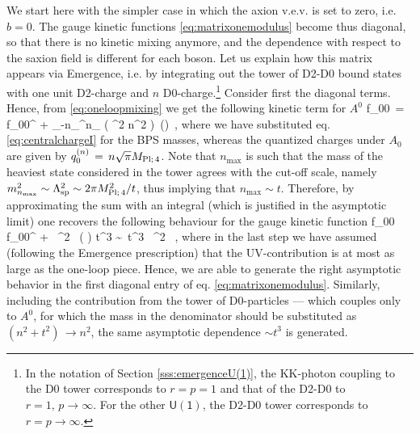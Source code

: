 We start here with the simpler case in which the axion v.e.v. is set to zero, i.e. $b=0$. The gauge kinetic functions \eqref{eq:matrixonemodulus} become thus diagonal, so that there is no kinetic mixing anymore, and the dependence with respect to the saxion field is different for each boson. Let us explain how this matrix appears via Emergence, i.e. by integrating out the tower of D2-D0 bound states with one unit D2-charge and $n$ D0-charge.\footnote{In the notation of Section \ref{sss:emergenceU(1)}, the KK-photon coupling to the D0 tower corresponds to $r=p=1$ and that of the D2-D0 to $r=1,\, p \to \infty$. For the other $\mathsf{U(1)}$, the D2-D0 tower corresponds to $r=p \to \infty$.} Consider first the diagonal terms. Hence, from \eqref{eq:oneloopmixing} we get the following kinetic term for $A^0$ 
%
\beq \label{eq:f00}
		f_{00}\, =\, f_{00}^{} +  \sum_{-n_{}}^{n_{}}  \left( \pi \Mpf^2 n^2 \right)\ \log \left(\right)\, ,
\eeq
%
where we have substituted eq. \eqref{eq:centralchargeI} for the BPS masses, whereas the quantized charges under $A_0$ are given by $q_0^{(n)}\, =\, n  \sqrt{\pi} M_{\text{Pl;}\, 4}$. Note that $n_{\text{max}}$ is such that the mass of the heaviest state considered in the tower agrees with the cut-off scale, namely $m_{n_{\text{max}}}^2 \sim \Lambda_{\text{sp}}^2 \sim 2 \pi M_{\text{Pl;}\, 4}^2/ t$, thus implying that $n_{\text{max}} \sim t$. Therefore, by approximating the sum with an integral (which is justified in the asymptotic limit) one recovers the following behaviour for the gauge kinetic function
%
\beq 
		f_{00}\, \simeq\, f_{00}^{} +  \beta \,  \Mpf^2 \, \left( \right)
		t^3 \sim  \,  t^3 \, \Mpf^2 \, ,
\eeq
%
where in the last step we have assumed (following the Emergence prescription) that the UV-contribution is at most as large as the one-loop piece. Hence, we are able to generate the right asymptotic behavior in the first diagonal entry of eq. \eqref{eq:matrixonemodulus}. Similarly, including the contribution from the tower of D0-particles --- which couples only to $A^0$, for which the mass in the denominator should be substituted as $(n^2+t^2) \, \to n^2$, the same asymptotic dependence $\sim t^3$ is generated.
		
